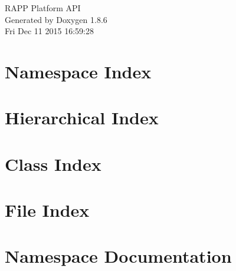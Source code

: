 \documentclass[twoside]{book}
\newcommand{\clearemptydoublepage}{%
  \newpage{\pagestyle{empty}\cleardoublepage}%
}
\begin{document}
\hypersetup{pageanchor=false}
\begin{titlepage}
\vspace*{7cm}
\begin{center}%
{\Large R\-A\-P\-P Platform A\-P\-I }\\
\vspace*{1cm}
{\large Generated by Doxygen 1.8.6}\\
\vspace*{0.5cm}
{\small Fri Dec 11 2015 16:59:28}\\
\end{center}
\end{titlepage}
\clearemptydoublepage
\tableofcontents
\clearemptydoublepage
{}
\hypersetup{pageanchor=true}

\chapter{Namespace Index}

\chapter{Hierarchical Index}

\chapter{Class Index}

\chapter{File Index}

\chapter{Namespace Documentation}












\end{document}
